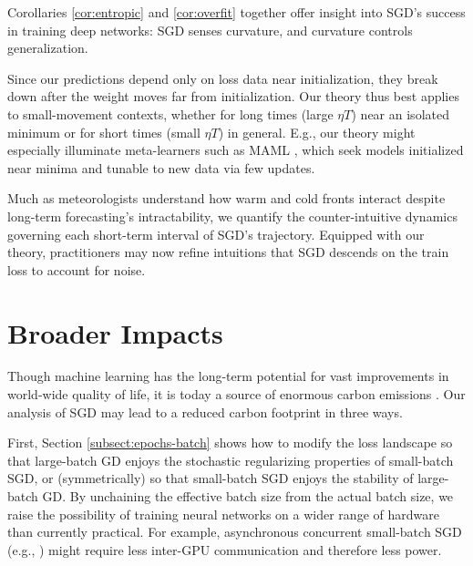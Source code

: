 \documentclass{article}
\theoremstyle{plain}
\theoremstyle{definition}
\begin{document}

        Corollaries \ref{cor:entropic} and \ref{cor:overfit} together offer
        insight into SGD's success in training deep networks: SGD senses
        curvature, and curvature controls generalization.

        Since our predictions depend only on loss data near initialization,
        they break down after the weight moves far from initialization.  Our
        theory thus best applies to small-movement contexts, whether for long
        times (large $\eta T$) near an isolated minimum or for short times
        (small $\eta T$) in general.  E.g., our theory might especially
        illuminate meta-learners such as MAML \citep{fi17}, which seek models
        initialized near minima and tunable to new data via few updates.

        Much as meteorologists understand how warm and cold fronts interact
        despite long-term forecasting's intractability, we quantify the
        counter-intuitive dynamics governing each short-term interval of SGD's
        trajectory.  Equipped with our theory, practitioners may now
        refine intuitions that SGD descends on the train loss to account for
        noise.
       


\section*{Broader Impacts}

    Though machine learning has the long-term potential for vast improvements
    in world-wide quality of life, it is today a source of enormous carbon
    emissions \citep{st19}.  Our analysis of SGD may lead to a reduced carbon
    footprint in three ways. 
     
    First, Section \ref{subsect:epochs-batch} shows how to modify the loss
    landscape so that large-batch GD enjoys the stochastic regularizing
    properties of small-batch SGD, or (symmetrically) so that small-batch SGD
    enjoys the stability of large-batch GD.  By unchaining the effective batch
    size from the actual batch size, we raise the possibility of training
    neural networks on a wider range of hardware than currently practical.  For
    example, asynchronous concurrent small-batch SGD (e.g., \cite{ni11}) might
    require less inter-GPU communication and therefore less power.
     
\end{document}
